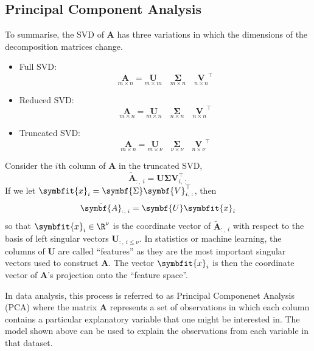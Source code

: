 \documentclass{article}
\begin{document}
\subsection{Principal Component Analysis}
To summarise, the SVD of \(\symbf{A}\) has three variations in which the dimensions of the decomposition matrices change.
\begin{itemize}
    \item Full SVD\@:
          \begin{equation*}
              \underset{m \times n}{\symbf{A}} = \underset{m \times m}{\symbf{U}} \quad \underset{m \times n}{\symbf{\Sigma}} \quad \underset{n \times n}{\symbf{V}}^\top
          \end{equation*}
    \item Reduced SVD\@:
          \begin{equation*}
              \underset{m \times n}{\symbf{A}} = \underset{m \times n}{\symbf{U}} \quad \underset{n \times n}{\symbf{\Sigma}} \quad \underset{n \times n}{\symbf{V}}^\top
          \end{equation*}
    \item Truncated SVD\@:
          \begin{equation*}
              \underset{m \times n}{\symbf{A}} = \underset{m \times \nu}{\symbf{U}} \quad \underset{\nu \times \nu}{\symbf{\Sigma}} \quad \underset{n \times \nu}{\symbf{V}}^\top
          \end{equation*}
\end{itemize}
Consider the \(i\)th column of \(\symbf{A}\) in the truncated SVD,
\begin{equation*}
    \tilde{\symbf{A}}_{:,\:i} = \symbf{U} \symbf{\Sigma} \symbf{V}_{i,\: :}^\top
\end{equation*}
If we let \(\symbfit{x}_i = \symbf{\Sigma} \symbf{V}_{i,\: :}^\top\), then
\begin{equation*}
    \tilde{\symbf{A}}_{:,\:i} = \symbf{U} \symbfit{x}_i
\end{equation*}
so that \(\symbfit{x}_i \in \R^{\nu}\) is the coordinate vector of \(\tilde{\symbf{A}}_{:,\:i}\) with respect to the basis of left
singular vectors \(\symbf{U}_{:,\: i \leq \nu}\). In statistics or machine learning, the columns of \(\symbf{U}\) are called ``features''
as they are the most important singular vectors used to construct \(\symbf{A}\). The vector \(\symbfit{x}_i\) is then the coordinate
vector of \(\symbf{A}\)'s projection onto the ``feature space''.

In data analysis, this process is referred to as Principal Componenet Analysis (PCA) where the matrix
\(\symbf{A}\) represents a set of observations in which each column contains a particular explanatory variable
that one might be interested in. The model shown above can be used to explain the observations from each
variable in that dataset.
\end{document}
